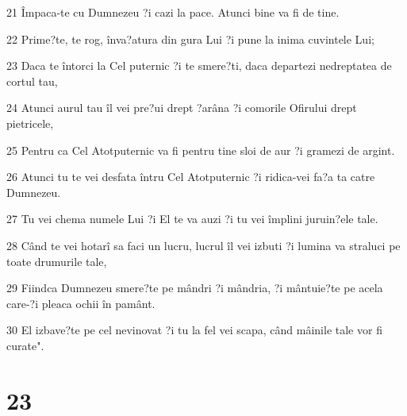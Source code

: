 \par 21 Împaca-te cu Dumnezeu ?i cazi la pace. Atunci bine va fi de tine.
\par 22 Prime?te, te rog, înva?atura din gura Lui ?i pune la inima cuvintele Lui;
\par 23 Daca te întorci la Cel puternic ?i te smere?ti, daca departezi nedreptatea de cortul tau,
\par 24 Atunci aurul tau îl vei pre?ui drept ?arâna ?i comorile Ofirului drept pietricele,
\par 25 Pentru ca Cel Atotputernic va fi pentru tine sloi de aur ?i gramezi de argint.
\par 26 Atunci tu te vei desfata întru Cel Atotputernic ?i ridica-vei fa?a ta catre Dumnezeu.
\par 27 Tu vei chema numele Lui ?i El te va auzi ?i tu vei împlini juruin?ele tale.
\par 28 Când te vei hotarî sa faci un lucru, lucrul îl vei izbuti ?i lumina va straluci pe toate drumurile tale,
\par 29 Fiindca Dumnezeu smere?te pe mândri ?i mândria, ?i mântuie?te pe acela care-?i pleaca ochii în pamânt.
\par 30 El izbave?te pe cel nevinovat ?i tu la fel vei scapa, când mâinile tale vor fi curate".

\chapter{23}

